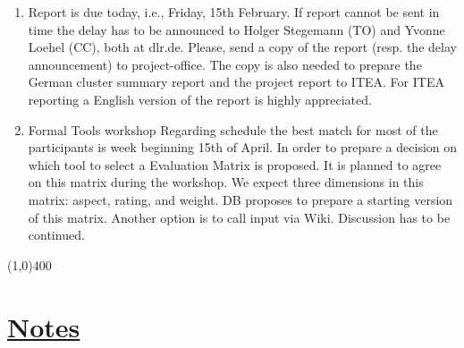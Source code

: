 \documentclass[a4paper]{article}
\begin{document}
\begin{enumerate}

\item Report is due today, i.e., Friday, 15th February.\newline
If report cannot be sent in time the delay has to be announced to Holger Stegemann (TO) and Yvonne Loehel (CC), both at dlr.de.\newline
Please, send a copy of the report (resp. the delay announcement) to project-office. The copy is also needed to prepare the German cluster summary report and the project report to ITEA. 
For ITEA reporting a English version of the report is highly appreciated.

\item Formal Tools workshop\newline
Regarding schedule the best match for most of the participants is week beginning 15th of April. In order to prepare a decision on which tool to select a Evaluation Matrix is proposed. It is planned to agree on this matrix during the workshop. We expect three dimensions in this matrix: aspect, rating, and weight. DB proposes to prepare a  starting version of this matrix. Another option is to call input via Wiki. Discussion has to be continued.

\end{enumerate}

\line(1,0){400}
\section*{\underline{Notes}}
\end{document}
